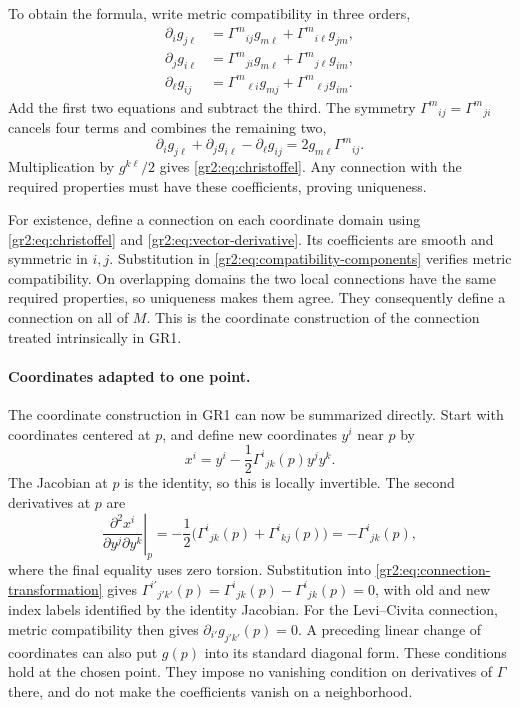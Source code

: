 \documentclass[11pt,a4paper]{article}
\numberwithin{equation}{section}
\begin{document}
To obtain the formula, write metric compatibility in three orders,
\begin{align*}
 \partial_i g_{j\ell}
 &=\Gamma^m{}_{ij}g_{m\ell}+\Gamma^m{}_{i\ell}g_{jm},\\
 \partial_j g_{i\ell}
 &=\Gamma^m{}_{ji}g_{m\ell}+\Gamma^m{}_{j\ell}g_{im},\\
 \partial_\ell g_{ij}
 &=\Gamma^m{}_{\ell i}g_{mj}+\Gamma^m{}_{\ell j}g_{im}.
\end{align*}
Add the first two equations and subtract the third. The symmetry
\(\Gamma^m{}_{ij}=\Gamma^m{}_{ji}\) cancels four terms and combines the
remaining two,
\[
 \partial_i g_{j\ell}+\partial_j g_{i\ell}-\partial_\ell g_{ij}
 =2g_{m\ell}\Gamma^m{}_{ij}.
\]
Multiplication by \(g^{k\ell}/2\) gives
\eqref{gr2:eq:christoffel}. Any connection with the required properties
must have these coefficients, proving uniqueness.

For existence, define a connection on each coordinate domain using
\eqref{gr2:eq:christoffel} and \eqref{gr2:eq:vector-derivative}. Its
coefficients are smooth and symmetric in \(i,j\). Substitution in
\eqref{gr2:eq:compatibility-components} verifies metric compatibility.
On overlapping domains the two local connections have the same required
properties, so uniqueness makes them agree. They consequently define a
connection on all of \(M\). This is the coordinate construction of the
connection treated intrinsically in GR1.

\paragraph{Coordinates adapted to one point.}
\label{gr2:normal-point}
The coordinate construction in GR1 can now be summarized directly.
Start with coordinates centered at \(p\), and define new coordinates
\(y^i\) near \(p\) by
\[
 x^i=y^i-\frac12\Gamma^i{}_{jk}(p)y^jy^k.
\]
The Jacobian at \(p\) is the identity, so this is locally invertible.
The second derivatives at \(p\) are
\[
 \left.\frac{\partial^2x^i}{\partial y^j\partial y^k}\right|_p
 =-\frac12\bigl(\Gamma^i{}_{jk}(p)+\Gamma^i{}_{kj}(p)\bigr)
 =-\Gamma^i{}_{jk}(p),
\]
where the final equality uses zero torsion. Substitution into
\eqref{gr2:eq:connection-transformation} gives
\(\Gamma^{i'}{}_{j'k'}(p)=\Gamma^i{}_{jk}(p)-\Gamma^i{}_{jk}(p)=0\),
with old and new index labels identified by the identity Jacobian. For the
Levi--Civita connection, metric compatibility then gives
\(\partial_{i'}g_{j'k'}(p)=0\). A preceding linear change of coordinates
can also put \(g(p)\) into its standard diagonal form. These conditions
hold at the chosen point. They impose no vanishing condition on
derivatives of \(\Gamma\) there, and do not make the coefficients vanish
on a neighborhood.
\end{document}
